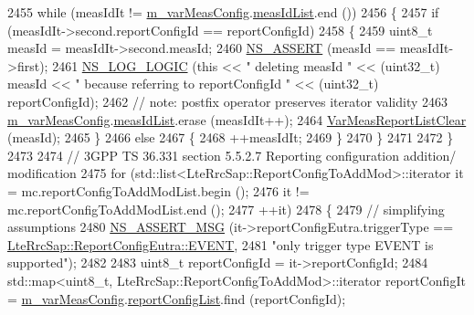 \begin{DoxyCode}
2455       \textcolor{keywordflow}{while} (measIdIt != \hyperlink{classns3_1_1LteUeRrc_a27a7773eedfdab964d2514d9eeb1c562}{m\_varMeasConfig}.\hyperlink{structns3_1_1LteUeRrc_1_1VarMeasConfig_aa7ad91f943892cec48ffa9a5ae872e8c}{measIdList}.end ())
2456         \{
2457           \textcolor{keywordflow}{if} (measIdIt->second.reportConfigId == reportConfigId)
2458             \{
2459               uint8\_t measId = measIdIt->second.measId;
2460               \hyperlink{assert_8h_a6dccdb0de9b252f60088ce281c49d052}{NS\_ASSERT} (measId == measIdIt->first);
2461               \hyperlink{group__logging_ga88acd260151caf2db9c0fc84997f45ce}{NS\_LOG\_LOGIC} (\textcolor{keyword}{this} << \textcolor{stringliteral}{" deleting measId "} << (uint32\_t) measId << \textcolor{stringliteral}{" because
       referring to reportConfigId "} << (uint32\_t)  reportConfigId);
2462               \textcolor{comment}{// note: postfix operator preserves iterator validity}
2463               \hyperlink{classns3_1_1LteUeRrc_a27a7773eedfdab964d2514d9eeb1c562}{m\_varMeasConfig}.\hyperlink{structns3_1_1LteUeRrc_1_1VarMeasConfig_aa7ad91f943892cec48ffa9a5ae872e8c}{measIdList}.erase (measIdIt++);
2464               \hyperlink{classns3_1_1LteUeRrc_aa1a5d20a96dec717502ccf0030921f53}{VarMeasReportListClear} (measId);
2465             \}
2466           \textcolor{keywordflow}{else}
2467             \{
2468               ++measIdIt;
2469             \}
2470         \}
2471 
2472     \}
2473 
2474   \textcolor{comment}{// 3GPP TS 36.331 section 5.5.2.7 Reporting configuration addition/ modification}
2475   \textcolor{keywordflow}{for} (std::list<LteRrcSap::ReportConfigToAddMod>::iterator it = mc.reportConfigToAddModList.begin ();
2476        it !=  mc.reportConfigToAddModList.end ();
2477        ++it)
2478     \{
2479       \textcolor{comment}{// simplifying assumptions}
2480       \hyperlink{assert_8h_aff5ece9066c74e681e74999856f08539}{NS\_ASSERT\_MSG} (it->reportConfigEutra.triggerType == 
      \hyperlink{structns3_1_1LteRrcSap_1_1ReportConfigEutra_a457763ab0765f15b66c62f8177fa412ea492651ea4b8c0f484edb0c018e908fcf}{LteRrcSap::ReportConfigEutra::EVENT},
2481                      \textcolor{stringliteral}{"only trigger type EVENT is supported"});
2482 
2483       uint8\_t reportConfigId = it->reportConfigId;
2484       std::map<uint8\_t, LteRrcSap::ReportConfigToAddMod>::iterator reportConfigIt = 
      \hyperlink{classns3_1_1LteUeRrc_a27a7773eedfdab964d2514d9eeb1c562}{m\_varMeasConfig}.\hyperlink{structns3_1_1LteUeRrc_1_1VarMeasConfig_a3ebdd65b8ad3393b5e869599e2a0afff}{reportConfigList}.find (reportConfigId);

\end{DoxyCode}
